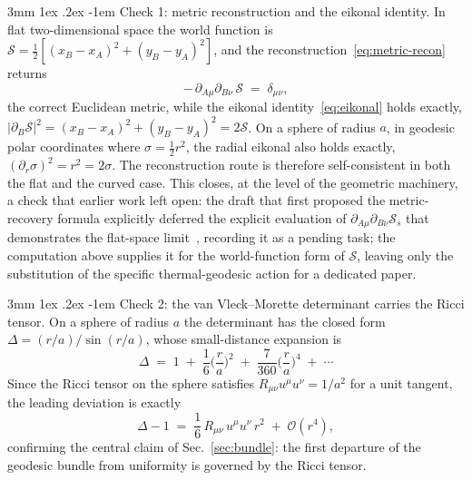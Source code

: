\documentclass[%
 reprint, amsmath,amssymb, aps, prb, ]{revtex4-2}
\makeatletter
\numberwithin{equation}{section}
\renewcommand\paragraph{%
  \@startsection{paragraph}{4}{\z@}%
    {3mm \@plus 1ex \@minus .2ex}%
    {-1em}%
    {\normalfont\normalsize\itshape}}
\makeatother
\begin{document}
\paragraph{Check 1: metric reconstruction and the eikonal identity.}
In flat two-dimensional space the world function is $\mathcal{S}=\tfrac12[(x_B-x_A)^2+(y_B-y_A)^2]$, and the reconstruction~\eqref{eq:metric-recon} returns
\begin{equation}
-\,\partial_{A\mu}\partial_{B\nu}\,\mathcal{S} \;=\; \delta_{\mu\nu},
\label{eq:check1-metric}
\end{equation}
the correct Euclidean metric, while the eikonal identity~\eqref{eq:eikonal} holds exactly, $|\partial_B\mathcal{S}|^2=(x_B-x_A)^2+(y_B-y_A)^2=2\mathcal{S}$. On a sphere of radius $a$, in geodesic polar coordinates where $\sigma=\tfrac12 r^2$, the radial eikonal also holds exactly, $(\partial_r\sigma)^2=r^2=2\sigma$. The reconstruction route is therefore self-consistent in both the flat and the curved case. This closes, at the level of the geometric machinery, a check that earlier work left open: the draft that first proposed the metric-recovery formula explicitly deferred the explicit evaluation of $\partial_{A\mu}\partial_{B\nu}\mathcal{S}_s$ that demonstrates the flat-space limit~\cite{hanamura51}, recording it as a pending task; the computation above supplies it for the world-function form of $\mathcal{S}$, leaving only the substitution of the specific thermal-geodesic action for a dedicated paper.

\paragraph{Check 2: the van Vleck--Morette determinant carries the Ricci tensor.}
On a sphere of radius $a$ the determinant has the closed form $\Delta=(r/a)/\sin(r/a)$, whose small-distance expansion is
\begin{equation}
\Delta \;=\; 1 \;+\; \frac{1}{6}\Big(\frac{r}{a}\Big)^2 \;+\; \frac{7}{360}\Big(\frac{r}{a}\Big)^4 \;+\; \cdots
\label{eq:check2-expand}
\end{equation}
Since the Ricci tensor on the sphere satisfies $R_{\mu\nu}u^\mu u^\nu=1/a^2$ for a unit tangent, the leading deviation is exactly
\begin{equation}
\Delta - 1 \;=\; \frac{1}{6}\,R_{\mu\nu}\,u^\mu u^\nu\,r^2 \;+\; \mathcal{O}(r^4),
\label{eq:check2-ricci}
\end{equation}
confirming the central claim of Sec.~\ref{sec:bundle}: the first departure of the geodesic bundle from uniformity is governed by the Ricci tensor.
\end{document}
